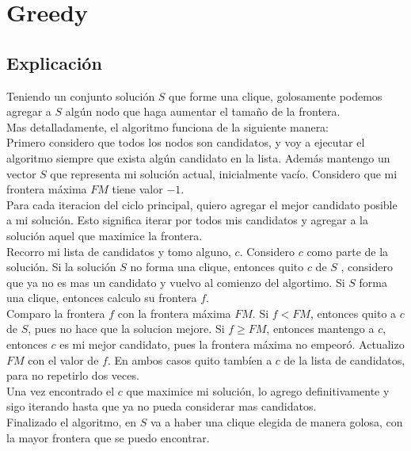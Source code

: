 
\section{Greedy}

\subsection{Explicación}
Teniendo un conjunto solución $S$ que forme una clique, golosamente podemos agregar a $S$ algún nodo que haga aumentar el tamaño de la frontera. \\

Mas detalladamente, el algoritmo funciona de la siguiente manera: \\

Primero considero que todos los nodos son candidatos, y voy a ejecutar el algoritmo siempre que exista algún candidato en la lista. Además mantengo un vector $S$ que representa mi solución actual, inicialmente vacío. Considero que mi frontera máxima $FM$ tiene valor $-1$. \\

Para cada iteracion del ciclo principal, quiero agregar el mejor candidato posible a mi solución. Esto significa iterar por todos mis candidatos y agregar a la solución aquel que maximice la frontera. \\

Recorro mi lista de candidatos y tomo alguno, $c$. Considero $c$ como parte de la solución. Si la solución $S$ no forma una clique, entonces quito $c$ de $S$ , considero que ya no es mas un candidato y vuelvo al comienzo del algortimo. Si $S$ forma una clique, entonces calculo su frontera $f$. \\

Comparo la frontera $f$ con la frontera máxima $FM$. Si $f < FM$, entonces quito a $c$ de $S$, pues no hace que la solucion mejore. Si $f \geq FM$, entonces mantengo a $c$, entonces $c$ es mi mejor candidato, pues la frontera máxima no empeoró. Actualizo $FM$ con el valor de $f$. En ambos casos quito tambíen a $c$ de la lista de candidatos, para no repetirlo dos veces. \\

Una vez encontrado el $c$ que maximice mi solución, lo agrego definitivamente y sigo iterando hasta que ya no pueda considerar mas candidatos. \\

Finalizado el algoritmo, en $S$ va a haber una clique elegida de manera golosa, con la mayor frontera que se puedo encontrar. \\


